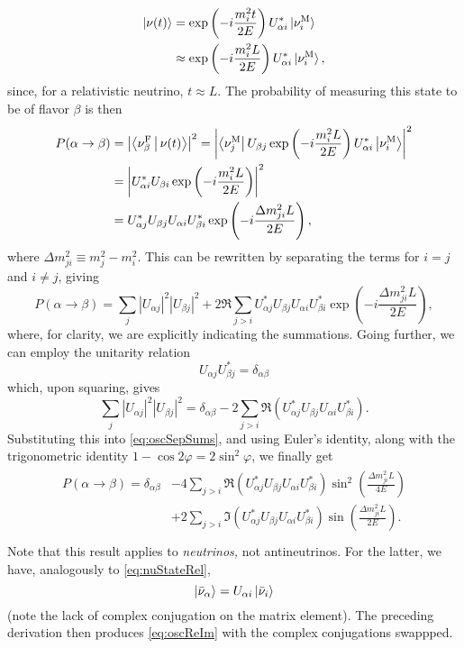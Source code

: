 \documentclass[../thesis.tex]{subfiles}
\begin{document}
\begin{align*}
  \ket{\nu(t)} &= \exp\left(-i\frac{m_i^2t}{2E}\right) U^*_{\alpha i} \ket{\nu^{\mathrm{M}}_i} \\
             &\approx \exp\left(-i\frac{m_i^2L}{2E}\right) U^*_{\alpha i} \ket{\nu^{\mathrm{M}}_i},
\end{align*}
since, for a relativistic neutrino, \(t \approx L\). The probability of measuring this state to be of flavor $\beta$ is then
\begin{align*}
  P(\alpha \rightarrow \beta)
  &= \left|\Braket{\nu^{\mathrm{F}}_\beta|\nu(t)}\right|^2
    = \left| \Bra{\nu^{\mathrm{M}}_j} U_{\beta j} \exp\left( -i\frac{m_i^2L}{2E} \right) U^*_{\alpha i}\Ket{\nu^{\mathrm{M}}_i}\right|^2 \\
  &=  \left| U^*_{\alpha i} U_{\beta i} \exp\left( -i \frac{m_i^2L}{2E} \right)\right|^2 \\
  &= U^*_{\alpha j} U_{\beta j} U_{\alpha i} U^*_{\beta i} \exp\left( -i \frac{\Delta m^2_{ji}L}{2E} \right),
\end{align*}
where \(\Delta m^2_{ji} \equiv m^2_j - m^2_i\). This can be rewritten by separating the terms for \(i = j\) and \(i \neq j\), giving
\begin{equation}
  \label{eq:oscSepSums}
  P(\alpha \rightarrow \beta) = \sum_{j} |U_{\alpha j}|^2 |U_{\beta j}|^2
  + 2 \Re \sum_{j>i} U^*_{\alpha j} U_{\beta j} U_{\alpha i} U^*_{\beta i}
  \exp\left( -i \frac{\Delta m^2_{ji}L}{2E} \right),
\end{equation}
where, for clarity, we are explicitly indicating the summations. Going further, we can employ the unitarity relation
\begin{equation*}
  U_{\alpha j} U^*_{\beta j} = \delta_{\alpha \beta}
\end{equation*}
which, upon squaring, gives
\begin{equation*}
  \sum_j |U_{\alpha j}|^2 |U_{\beta j}|^2 = \delta_{\alpha \beta}
  - 2 \sum_{j > i} \Re(U^*_{\alpha j} U_{\beta j} U_{\alpha i} U^*_{\beta i}).
\end{equation*}
Substituting this into \eqref{eq:oscSepSums}, and using Euler's identity, along with the trigonometric identity \(1 - \cos 2\varphi = 2\sin^2 \varphi\), we finally get
\begin{align}
  \label{eq:oscReIm}
  \begin{split}
    P(\alpha \rightarrow \beta) = \delta_{\alpha \beta} &- 4\sum_{j > i} \Re(U^*_{\alpha j} U_{\beta j} U_{\alpha i} U^*_{\beta i})
    \sin^2 \left( \frac{\Delta m^2_{ji}L}{4E} \right) \\
    &+ 2\sum_{j > i} \Im(U^*_{\alpha j} U_{\beta j} U_{\alpha i} U^*_{\beta i})
    \sin \left( \frac{\Delta m^2_{ji}L}{2E} \right). \\
  \end{split}
\end{align}
Note that this result applies to \emph{neutrinos,} not antineutrinos. For the latter, we have, analogously to \eqref{eq:nuStateRel},
\begin{equation*}
  \ket{\bar\nu_\alpha} = U_{\alpha i}\ket{\bar\nu_i}
\end{equation*}
(note the lack of complex conjugation on the matrix element). The preceding derivation then produces \eqref{eq:oscReIm} with the complex conjugations swappped.
\end{document}
